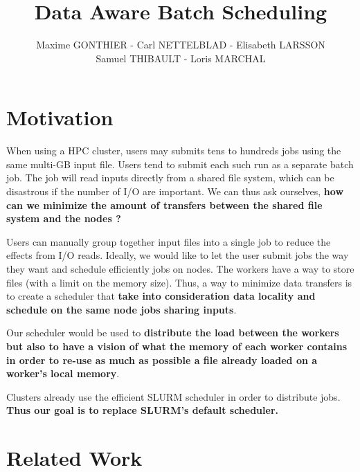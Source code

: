 \documentclass[a4paper]{article}
\title{Data Aware Batch Scheduling}
\author{Maxime GONTHIER - Carl NETTELBLAD - Elisabeth LARSSON \\ Samuel THIBAULT - Loris MARCHAL}
\begin{document}
\maketitle
\tableofcontents
\listoffigures
\newpage


\section{Motivation}

When using a HPC cluster, users may submits tens to hundreds jobs using the same multi-GB input file.
Users tend to submit each such run as a separate batch job.
The job will read inputs directly from a shared file system, which can be disastrous if the number of I/O are important.
We can thus ask ourselves, \textbf{how can we minimize the amount of transfers between the shared file system and the nodes ?}

Users can manually group together input files into a single job to reduce the effects from I/O reads.
Ideally, we would like to let the user submit jobs the way they want and schedule efficiently jobs on nodes.
The workers have a way to store files (with a limit on the memory size).
Thus, a way to minimize data transfers is to create a scheduler that \textbf{take into consideration data locality and schedule on the same node jobs sharing inputs}.

Our scheduler would be used to \textbf{distribute the load between the workers but also to have a vision of what the memory of each worker contains in order to re-use as much as possible a file already loaded on a worker's local memory}.

Clusters already use the efficient SLURM scheduler in order to distribute jobs.
\textbf{Thus our goal is to replace SLURM's default scheduler.}

\section{Related Work}
\end{document}
